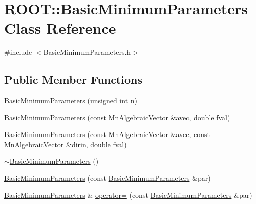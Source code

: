 \hypertarget{classROOT_1_1Minuit2_1_1BasicMinimumParameters}{}\section{R\+O\+OT\+:\+:Basic\+Minimum\+Parameters Class Reference}
\label{classROOT_1_1Minuit2_1_1BasicMinimumParameters}


{\ttfamily \#include $<$Basic\+Minimum\+Parameters.\+h$>$}

\subsection*{Public Member Functions}
\begin{DoxyCompactItemize}
\item 
\mbox{\hyperlink{classROOT_1_1Minuit2_1_1BasicMinimumParameters_ac3a8db51a43b7f99f9e71dcfb9ca9009}{Basic\+Minimum\+Parameters}} (unsigned int n)
\item 
\mbox{\hyperlink{classROOT_1_1Minuit2_1_1BasicMinimumParameters_aebd12d902d3b0badb28a804ccfb4ed8a}{Basic\+Minimum\+Parameters}} (const \mbox{\hyperlink{namespaceROOT_1_1Minuit2_a62ed97730a1ca8d3fbaec64a19aa11c9}{Mn\+Algebraic\+Vector}} \&avec, double fval)
\item 
\mbox{\hyperlink{classROOT_1_1Minuit2_1_1BasicMinimumParameters_a37ff3c6b2ad9075c4c3e347af3febcbe}{Basic\+Minimum\+Parameters}} (const \mbox{\hyperlink{namespaceROOT_1_1Minuit2_a62ed97730a1ca8d3fbaec64a19aa11c9}{Mn\+Algebraic\+Vector}} \&avec, const \mbox{\hyperlink{namespaceROOT_1_1Minuit2_a62ed97730a1ca8d3fbaec64a19aa11c9}{Mn\+Algebraic\+Vector}} \&dirin, double fval)
\item 
\mbox{\hyperlink{classROOT_1_1Minuit2_1_1BasicMinimumParameters_a425049822924a832736afbf3b21dcdb6}{$\sim$\+Basic\+Minimum\+Parameters}} ()
\item 
\mbox{\hyperlink{classROOT_1_1Minuit2_1_1BasicMinimumParameters_a8714fc623b46e7f891748583ff7746b9}{Basic\+Minimum\+Parameters}} (const \mbox{\hyperlink{classROOT_1_1Minuit2_1_1BasicMinimumParameters}{Basic\+Minimum\+Parameters}} \&par)
\item 
\mbox{\hyperlink{classROOT_1_1Minuit2_1_1BasicMinimumParameters}{Basic\+Minimum\+Parameters}} \& \mbox{\hyperlink{classROOT_1_1Minuit2_1_1BasicMinimumParameters_a468d3eefd1f7080b499f090afdb3eab4}{operator=}} (const \mbox{\hyperlink{classROOT_1_1Minuit2_1_1BasicMinimumParameters}{Basic\+Minimum\+Parameters}} \&par)

\end{DoxyCompactItemize}
